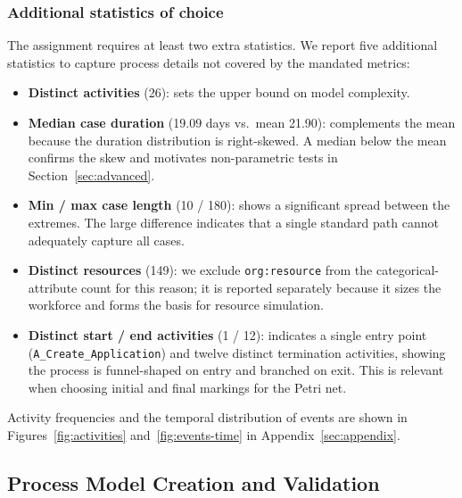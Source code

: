 \documentclass[
  english,        %
  font=times,     %
  twocolumn,      %
]{tumarticle}
\begin{document}
\subsubsection*{Additional statistics of choice}\label{sec:addstats}
The assignment requires at least two extra statistics. We report five additional statistics to capture process details not covered by the mandated metrics:
\begin{itemize}
    \item \textbf{Distinct activities} (\num{26}): sets the upper bound on model complexity.
    \item \textbf{Median case duration} (\num{19.09} days vs.\ mean \num{21.90}): complements the mean because the duration distribution is right-skewed. A median below the mean confirms the skew and motivates non-parametric tests in Section~\ref{sec:advanced}.
    \item \textbf{Min / max case length} (\num{10} / \num{180}): shows a significant spread between the extremes. The large difference indicates that a single standard path cannot adequately capture all cases.
    \item \textbf{Distinct resources} (\num{149}): we exclude \texttt{org:resource} from the categorical-attribute count for this reason; it is reported separately because it sizes the workforce and forms the basis for resource simulation.
    \item \textbf{Distinct start / end activities} (\num{1} / \num{12}): indicates a single entry point (\texttt{A\_Create\_Application}) and twelve distinct termination activities, showing the process is funnel-shaped on entry and branched on exit. This is relevant when choosing initial and final markings for the Petri net.
\end{itemize}

Activity frequencies and the temporal distribution of events are shown in Figures~\ref{fig:activities} and~\ref{fig:events-time} in Appendix~\ref{sec:appendix}.

\subsection{Process Model Creation and Validation}\label{sec:model}
\end{document}
